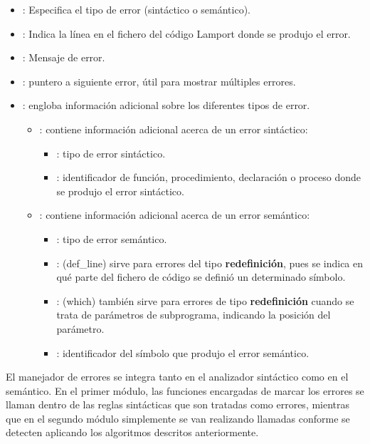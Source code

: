\begin{itemize}
    \item {}: Especifica el tipo de error (sintáctico o semántico).
    \item {}: Indica la línea en el fichero del código Lamport donde se produjo el error.
    \item {}: Mensaje de error.
    \item {}: puntero a siguiente error, útil para mostrar múltiples errores.
    \item {}: engloba información adicional sobre los diferentes tipos de error.
    \begin{itemize}
        \item {}: contiene información adicional acerca de un error sintáctico:
        \begin{itemize}
            \item {}: tipo de error sintáctico.
            \item {}: identificador de función, procedimiento, declaración o proceso donde se produjo el error sintáctico.
        \end{itemize}
    \end{itemize}
    \begin{itemize}
        \item {}: contiene información adicional acerca de un error semántico:
        \begin{itemize}
            \item {}: tipo de error semántico.
            \item {}: (def\_line) sirve para errores del tipo \textbf{redefinición}, pues se indica en qué parte del fichero de código se definió un determinado símbolo.
            \item {}: (which) también sirve para errores de tipo \textbf{redefinición} cuando se trata de parámetros de subprograma, indicando la posición del parámetro.
            \item {}: identificador del símbolo que produjo el error semántico.
        \end{itemize}
    \end{itemize}
\end{itemize}

\vspace{0.5cm}
El manejador de errores se integra tanto en el analizador sintáctico como en el semántico. En el primer módulo, las funciones encargadas de marcar los errores se llaman dentro de las reglas sintácticas que son tratadas como errores, mientras que en el segundo módulo simplemente se van realizando llamadas conforme se detecten aplicando los algoritmos descritos anteriormente.

